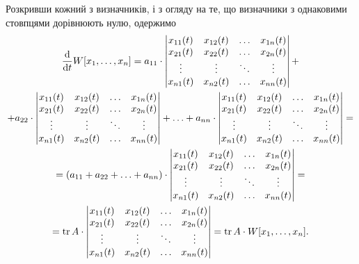 Розкривши кожний з визначників, і з огляду на те, що визначники з однаковими стовпцями дорівнюють нулю, одержимо
\begin{multline*}
	\frac{\mathop{}\!\mathrm{d}}{\mathop{}\!\mathrm{d} t} W[x_1, \ldots, x_n] = a_{11} \cdot \begin{vmatrix} x_{11}(t) & x_{12}(t) & \ldots & x_{1n}(t) \\ x_{21}(t) & x_{22}(t) & \ldots & x_{2n}(t) \\ \vdots & \vdots & \ddots & \vdots \\ x_{n1}(t) & x_{n2}(t) & \ldots & x_{nn}(t) \end{vmatrix} + \\
	+ a_{22} \cdot \begin{vmatrix} x_{11}(t) & x_{12}(t) & \ldots & x_{1n}(t) \\ x_{21}(t) & x_{22}(t) & \ldots & x_{2n}(t) \\ \vdots & \vdots & \ddots & \vdots \\ x_{n1}(t) & x_{n2}(t) & \ldots & x_{nn}(t) \end{vmatrix} + \ldots + a_{nn} \cdot \begin{vmatrix} x_{11}(t) & x_{12}(t) & \ldots & x_{1n}(t) \\ x_{21}(t) & x_{22}(t) & \ldots & x_{2n}(t) \\ \vdots & \vdots & \ddots & \vdots \\ x_{n1}(t) & x_{n2}(t) & \ldots & x_{nn}(t) \end{vmatrix} = \\
	= (a_{11} + a_{22} + \ldots + a_{nn}) \cdot \begin{vmatrix} x_{11}(t) & x_{12}(t) & \ldots & x_{1n}(t) \\ x_{21}(t) & x_{22}(t) & \ldots & x_{2n}(t) \\ \vdots & \vdots & \ddots & \vdots \\ x_{n1}(t) & x_{n2}(t) & \ldots & x_{nn}(t) \end{vmatrix} = \\
	= \operatorname{tr} A \cdot \begin{vmatrix} x_{11}(t) & x_{12}(t) & \ldots & x_{1n}(t) \\ x_{21}(t) & x_{22}(t) & \ldots & x_{2n}(t) \\ \vdots & \vdots & \ddots & \vdots \\ x_{n1}(t) & x_{n2}(t) & \ldots & x_{nn}(t) \end{vmatrix} = \operatorname{tr} A \cdot W[x_1, \ldots, x_n].
\end{multline*}

